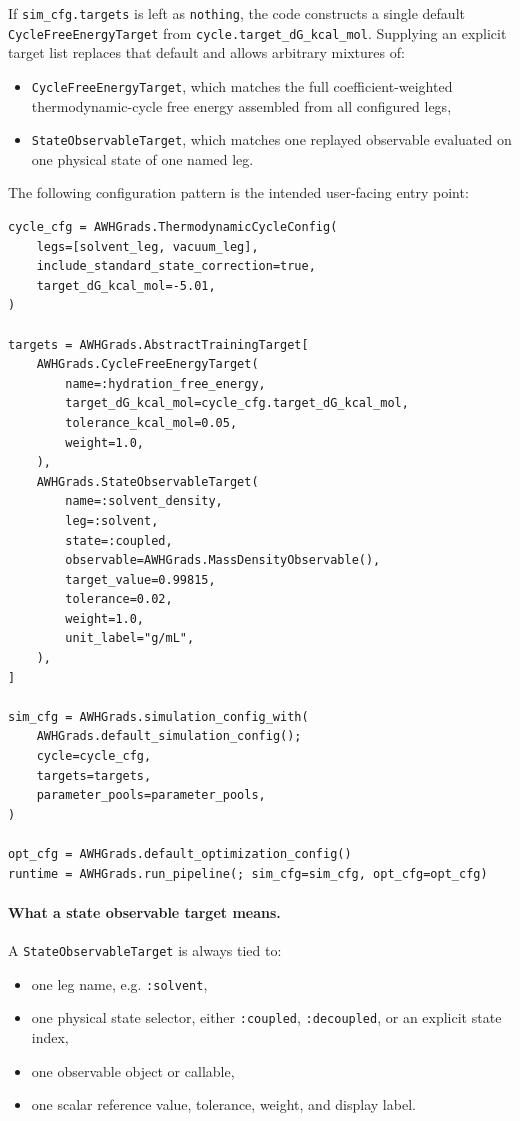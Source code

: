 If \texttt{sim\_cfg.targets} is left as \texttt{nothing}, the code constructs a
single default \texttt{CycleFreeEnergyTarget} from
\texttt{cycle.target\_dG\_kcal\_mol}. Supplying an explicit target list replaces
that default and allows arbitrary mixtures of:

\begin{itemize}
    \item \texttt{CycleFreeEnergyTarget}, which matches the full
    coefficient-weighted thermodynamic-cycle free energy assembled from all
    configured legs,
    \item \texttt{StateObservableTarget}, which matches one replayed observable
    evaluated on one physical state of one named leg.
\end{itemize}

The following configuration pattern is the intended user-facing entry point:

\begin{verbatim}
cycle_cfg = AWHGrads.ThermodynamicCycleConfig(
    legs=[solvent_leg, vacuum_leg],
    include_standard_state_correction=true,
    target_dG_kcal_mol=-5.01,
)

targets = AWHGrads.AbstractTrainingTarget[
    AWHGrads.CycleFreeEnergyTarget(
        name=:hydration_free_energy,
        target_dG_kcal_mol=cycle_cfg.target_dG_kcal_mol,
        tolerance_kcal_mol=0.05,
        weight=1.0,
    ),
    AWHGrads.StateObservableTarget(
        name=:solvent_density,
        leg=:solvent,
        state=:coupled,
        observable=AWHGrads.MassDensityObservable(),
        target_value=0.99815,
        tolerance=0.02,
        weight=1.0,
        unit_label="g/mL",
    ),
]

sim_cfg = AWHGrads.simulation_config_with(
    AWHGrads.default_simulation_config();
    cycle=cycle_cfg,
    targets=targets,
    parameter_pools=parameter_pools,
)

opt_cfg = AWHGrads.default_optimization_config()
runtime = AWHGrads.run_pipeline(; sim_cfg=sim_cfg, opt_cfg=opt_cfg)
\end{verbatim}

\paragraph{What a state observable target means.}

A \texttt{StateObservableTarget} is always tied to:

\begin{itemize}
    \item one leg name, e.g. \texttt{:solvent},
    \item one physical state selector, either \texttt{:coupled},
    \texttt{:decoupled}, or an explicit state index,
    \item one observable object or callable,
    \item one scalar reference value, tolerance, weight, and display label.
\end{itemize}


